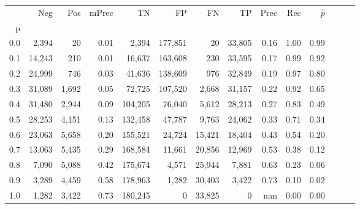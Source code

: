 \begin{tabular}{rrrrrrrrrrrrrr}
\toprule
{} &     Neg &    Pos & mPrec &       TN &       FP &      FN &      TP &  Prec &   Rec & $\hat{p}$ \\
p   &         &        &       &          &          &         &         &       &       &           \\
\midrule
0.0 &   2,394 &     20 &  0.01 &    2,394 &  177,851 &      20 &  33,805 &  0.16 &  1.00 &      0.99 \\
0.1 &  14,243 &    210 &  0.01 &   16,637 &  163,608 &     230 &  33,595 &  0.17 &  0.99 &      0.92 \\
0.2 &  24,999 &    746 &  0.03 &   41,636 &  138,609 &     976 &  32,849 &  0.19 &  0.97 &      0.80 \\
0.3 &  31,089 &  1,692 &  0.05 &   72,725 &  107,520 &   2,668 &  31,157 &  0.22 &  0.92 &      0.65 \\
0.4 &  31,480 &  2,944 &  0.09 &  104,205 &   76,040 &   5,612 &  28,213 &  0.27 &  0.83 &      0.49 \\
0.5 &  28,253 &  4,151 &  0.13 &  132,458 &   47,787 &   9,763 &  24,062 &  0.33 &  0.71 &      0.34 \\
0.6 &  23,063 &  5,658 &  0.20 &  155,521 &   24,724 &  15,421 &  18,404 &  0.43 &  0.54 &      0.20 \\
0.7 &  13,063 &  5,435 &  0.29 &  168,584 &   11,661 &  20,856 &  12,969 &  0.53 &  0.38 &      0.12 \\
0.8 &   7,090 &  5,088 &  0.42 &  175,674 &    4,571 &  25,944 &   7,881 &  0.63 &  0.23 &      0.06 \\
0.9 &   3,289 &  4,459 &  0.58 &  178,963 &    1,282 &  30,403 &   3,422 &  0.73 &  0.10 &      0.02 \\
1.0 &   1,282 &  3,422 &  0.73 &  180,245 &        0 &  33,825 &       0 &   nan &  0.00 &      0.00 \\
\bottomrule
\end{tabular}
